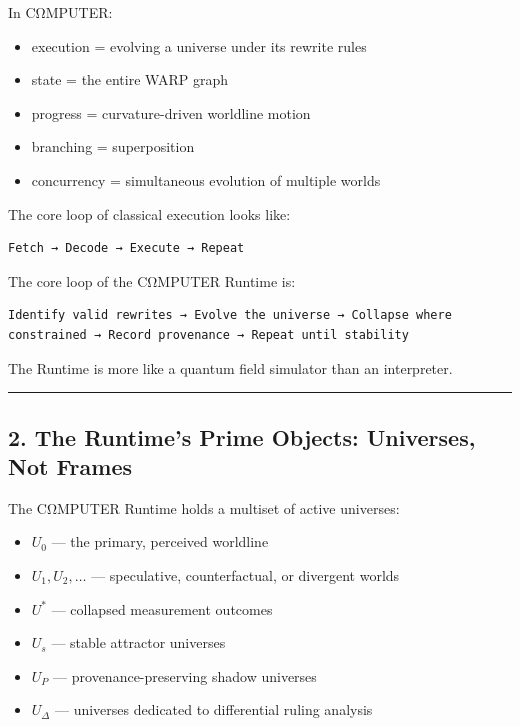 In CΩMPUTER:

\begin{itemize}
\tightlist
\item
  execution = evolving a universe under its rewrite rules
\item
  state = the entire WARP graph
\item
  progress = curvature-driven worldline motion
\item
  branching = superposition
\item
  concurrency = simultaneous evolution of multiple worlds
\end{itemize}

The core loop of classical execution looks like:

\begin{lstlisting}
Fetch → Decode → Execute → Repeat
\end{lstlisting}

The core loop of the CΩMPUTER Runtime is:

\begin{lstlisting}
Identify valid rewrites → Evolve the universe → Collapse where constrained → Record provenance → Repeat until stability
\end{lstlisting}

The Runtime is more like a quantum field simulator than an interpreter.

\begin{center}\rule{0.5\linewidth}{0.5pt}\end{center}

\subsection{2. The Runtime's Prime Objects: Universes, Not
Frames}\label{the-runtimes-prime-objects-universes-not-frames}

The CΩMPUTER Runtime holds a multiset of active universes:

\begin{itemize}
\tightlist
\item
  $U_0$ --- the primary, perceived worldline
\item
  $U_1, U_2, \ldots$ --- speculative, counterfactual, or divergent worlds
\item
  $U^*$ --- collapsed measurement outcomes
\item
  $U_s$ --- stable attractor universes
\item
  $U_P$ --- provenance-preserving shadow universes
\item
  $U_\Delta$ --- universes dedicated to differential ruling analysis
\end{itemize}

